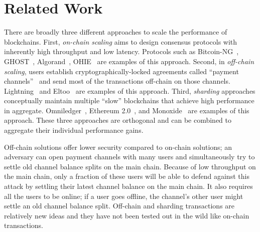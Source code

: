 \section{Related Work}
\label{sec:related}
There are broadly three different approaches to scale the performance of blockchains. First, \textit{on-chain scaling} aims to design consensus protocols with inherently high throughput and low  latency. Protocols such as Bitcoin-NG~\cite{bitcoin-ng}, GHOST~\cite{ghost}, Algorand~\cite{algorand}, OHIE~\cite{ohie} are examples of this approach. 
Second, in \textit{off-chain scaling}, users establish cryptographically-locked agreements called ``payment channels''~\cite{payment-channel} and send most of the transactions off-chain on those channels. 
Lightning~\cite{lightning} and Eltoo~\cite{decker2018eltoo} are examples of this approach. 
Third, \textit{sharding} approaches conceptually maintain multiple ``slow'' blockchains that achieve high performance in aggregate. Omniledger~\cite{kokoris2018omniledger}, Ethereum 2.0~\cite{buterin2016ethereum}, and Monoxide~\cite{monoxide} are examples of this approach. 
These three approaches are orthogonal and can be combined to aggregate their individual performance gains. 

Off-chain solutions offer lower security compared to on-chain solutions; an adversary can open payment channels with many users and simultaneously try to settle old channel balance splits
on the main chain. Because of low throughput on the main chain, only a fraction of these users will be able to defend against this attack by settling their latest channel balance on the main chain.
 
It also requires all the users to be online; if a user goes offline, the channel's other user might settle an old channel balance split.
Off-chain and sharding transactions are relatively new ideas and they have not been tested out in the wild like on-chain transactions. 
\fi

